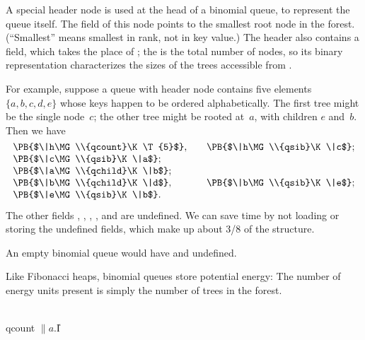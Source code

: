 A special header node is used at the head of a binomial queue, to
represent
the queue itself. The  field of this node points to the smallest
root node in the forest. (``Smallest'' means smallest in rank, not in
key value.) The header also contains a  field, which
takes the place of ; the  is the total number of
nodes,
so its binary representation characterizes the sizes of the trees
accessible from .

For example, suppose a queue with header node  contains five elements
$\{a,b,c,d,e\}$ whose keys happen to be ordered alphabetically. The first
tree might be the single node~$c$; the other tree might be rooted at~$a$,
with children $e$ and~$b$. Then we have
$$\vbox{\halign{#\hfil&\qquad#\hfil\cr
\PB{$\|h\MG\\{qcount}\K\T{5}$},&\PB{$\|h\MG\\{qsib}\K\|c$};\cr
\PB{$\|c\MG\\{qsib}\K\|a$};\cr
\PB{$\|a\MG\\{qchild}\K\|b$};\cr
\PB{$\|b\MG\\{qchild}\K\|d$},&\PB{$\|b\MG\\{qsib}\K\|e$};\cr
\PB{$\|e\MG\\{qsib}\K\|b$}.\cr}}$$
The other fields , , , , and
 are undefined. We can save time by not loading or
storing the
undefined fields, which make up about 3/8 of the structure.

An empty binomial queue would have  and  undefined.

Like Fibonacci heaps, binomial queues store potential energy: The
number of energy units present is simply the number of trees in the forest.

\Y\B\4\D\\{qcount}\5
$\|a.{}$\|I%
\par
\fi

